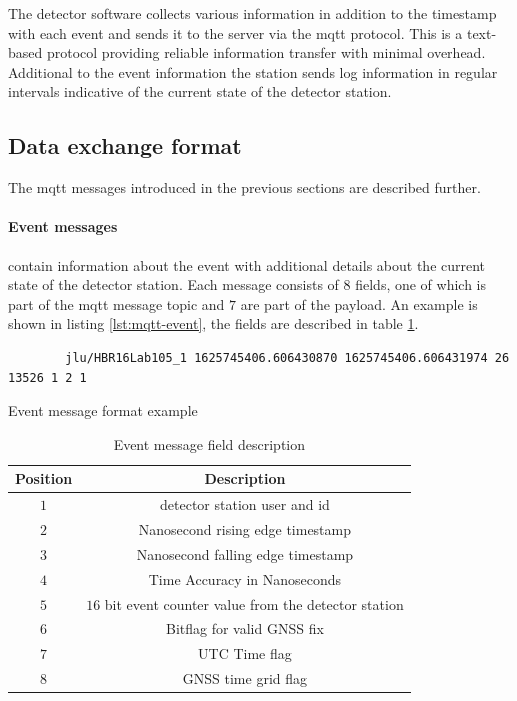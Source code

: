 \documentclass[abstract,toc,los,lof,english,10pt,glossary,acronyms]{jluthesis}
\begin{document}
The detector software collects various information in addition to the timestamp with each event and sends it to the server via the \acrfull{mqtt} protocol. This is a text-based protocol providing reliable information transfer with minimal overhead\cite{mqtt}. Additional to the event information the station sends log information in regular intervals indicative of the current state of the detector station.
\subsection{Data exchange format}
The \acrshort{mqtt} messages introduced in the previous sections are described further.

\paragraph{Event messages} contain information about the event with additional details about the current state of the detector station. Each message consists of $8$ fields, one of which is part of the \acrshort{mqtt} message topic and $7$ are part of the payload. An example is shown in listing \ref{lst:mqtt-event}, the fields are described in table \ref{tab:event-message}.
\begin{lstfloat}[H]
	\centering
	\begin{verbatim}
		jlu/HBR16Lab105_1 1625745406.606430870 1625745406.606431974 26 13526 1 2 1
	\end{verbatim}
	\caption{Event message format example}
	\label{lst:mqtt-event}
\end{lstfloat}
\begin{table}[H]
	\centering
	\begin{tabular}{| c | c |}
		\hline
		\textbf{Position} & \textbf{Description} \\
		\hline
		$1$ & detector station user and id \\
		\hline
		$2$ & Nanosecond rising edge timestamp \\
		\hline
		$3$ & Nanosecond falling edge timestamp \\
		\hline
		$4$ & Time Accuracy in Nanoseconds \\
		\hline
		$5$ & $16$ bit event counter value from the detector station \\
		\hline
		$6$ & Bitflag for valid GNSS fix \\
		\hline
		$7$ & UTC Time flag \\
		\hline
		$8$ & GNSS time grid flag \\
		\hline
	\end{tabular}
	\caption{Event message field description}
	\label{tab:event-message}
\end{table}
\end{document}

